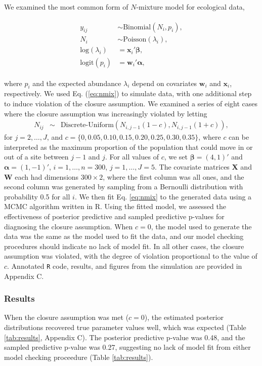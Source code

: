 \documentclass[12pt,english]{article}
\begin{document}
\begin{spacing}{1.9}
We examined the most common form of $N$-mixture model for ecological
data,
\begin{linenomath}
  \begin{align}
    \begin{split}
      y_{ij} & \sim \text{Binomial}(N_{i},p_i),\\
      N_{i} & \sim \text{Poisson}(\lambda_{i}), \\
      \text{log}(\lambda_i) & = \textbf{x}_i'\boldsymbol{\beta},
      \\
      \text{logit}(p_i) & = \textbf{w}_i'\boldsymbol{\alpha},
    \end{split}
                          \label{eq:nmix}
  \end{align}
\end{linenomath}
where $p_i$ and the expected abundance $\lambda_i$ depend on
covariates $\textbf{w}_i$ and $\textbf{x}_i$, respectively. We used
Eq. (\ref{eq:nmix}) to simulate data, with one additional step to
induce violation of the closure assumption. We examined a series of
eight cases where the closure assumption was increasingly violated by
letting
\begin{eqnarray*}
     N_{ij} & \sim & \text{Discrete-Uniform}(N_{i,j-1}(1-c), N_{i,j-1}(1+c)),
\end{eqnarray*}
for $j=2,\ldots,J$, and
$c = \{0, 0.05, 0.10, 0.15, 0.20, 0.25, 0.30, 0.35 \}$, where $c$ can
be interpreted as the maximum proportion of the population that could
move in or out of a site between $j-1$ and $j$. For all values of $c$,
we set $\boldsymbol{\beta}=(4,1)'$ and
$\boldsymbol{\alpha}=(1,-1)'$, $i=1,\ldots,n=300$,
$j=1,\ldots,J=5$. The covariate matrices \textbf{X} and \textbf{W}
each had dimensions $300\times 2$, where the first column was all
ones, and the second column was generated by sampling from a Bernoulli
distribution with probability 0.5 for all $i$. We then fit
Eq. \ref{eq:nmix} to the generated data using a MCMC algorithm written in R. Using the fitted model, we
assessed the effectiveness of posterior predictive and sampled
predictive p-values for diagnosing the closure assumption. When $c=0$,
the model used to generate the data was the same as the model used to
fit the data, and our model checking procedures should indicate no
lack of model fit. In all other cases, the closure assumption was
violated, with the degree of violation proportional to the value of
$c$. Annotated \texttt{R} code, results, and figures from the
simulation are provided in Appendix C.

\subsubsection{Results}
When the closure assumption was met ($c=0$), the estimated
posterior distributions recovered true parameter values well,
which was expected (Table \ref{tab:results}, Appendix C). The
posterior predictive p-value was 0.48, and the sampled predictive
p-value was 0.27, suggesting no lack of model fit from either
model checking proceedure (Table \ref{tab:results}).


\end{spacing}
\end{document}
